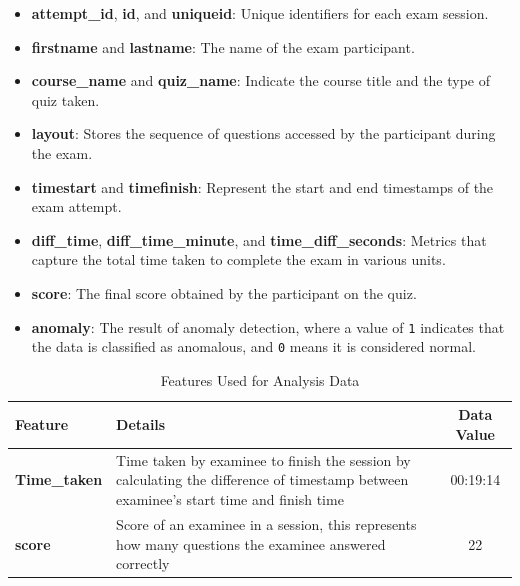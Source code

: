 \begin{itemize}
	\item \textbf{attempt\_id}, \textbf{id}, and \textbf{uniqueid}: Unique identifiers for each exam session.
	\item \textbf{firstname} and \textbf{lastname}: The name of the exam participant.
	\item \textbf{course\_name} and \textbf{quiz\_name}: Indicate the course title and the type of quiz taken.
	\item \textbf{layout}: Stores the sequence of questions accessed by the participant during the exam.
	\item \textbf{timestart} and \textbf{timefinish}: Represent the start and end timestamps of the exam attempt.
	\item \textbf{diff\_time}, \textbf{diff\_time\_minute}, and \textbf{time\_diff\_seconds}: Metrics that capture the total time taken to complete the exam in various units.
	\item \textbf{score}: The final score obtained by the participant on the quiz.
	\item \textbf{anomaly}: The result of anomaly detection, where a value of \texttt{1} indicates that the data is classified as anomalous, and \texttt{0} means it is considered normal.
\end{itemize}


\begin{table}[H]
	\centering
	\caption{Features Used for Analysis Data}
	\begin{tabular}{|l|p{10cm}|c|}
		\hline
		\textbf{Feature} & \textbf{Details} & \textbf{Data Value} \\
		\hline
		\textbf{Time\_taken} & Time taken by examinee to finish the session by calculating the difference of timestamp between examinee’s start time and finish time & 00:19:14 \\
		\hline
		\textbf{score} & Score of an examinee in a session, this represents how many questions the examinee answered correctly & 22 \\
		\hline
	\end{tabular}
\end{table}


